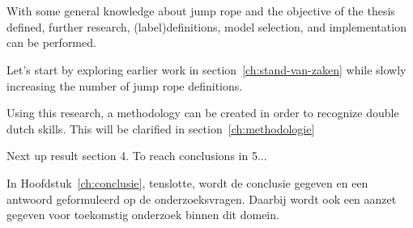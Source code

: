 \section{}%
\label{sec:opzet-bachelorproef}


With some general knowledge about jump rope and the objective of the thesis defined, further research, (label)definitions, model selection, and implementation can be performed.

Let’s start by exploring earlier work in section~\ref{ch:stand-van-zaken} while slowly increasing the number of jump rope definitions.

Using this research, a methodology can be created in order to recognize double dutch skills. This will be clarified in section~\ref{ch:methodologie}

Next up result section 4.
To reach conclusions in 5...

In Hoofdstuk~\ref{ch:conclusie}, tenslotte, wordt de conclusie gegeven en een antwoord geformuleerd op de onderzoeksvragen. Daarbij wordt ook een aanzet gegeven voor toekomstig onderzoek binnen dit domein.